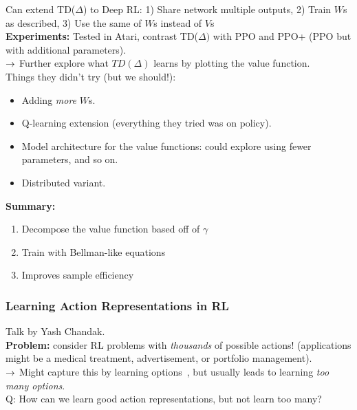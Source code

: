 Can extend TD($\Delta$) to Deep RL: 1) Share network multiple outputs, 2) Train $W$s as described, 3) Use the same of $W$s instead of $V$s \\

{\bf Experiments:} Tested in Atari, contrast TD($\Delta)$ with PPO and PPO+ (PPO but with additional parameters). \\

$\rightarrow$ Further explore what $TD(\Delta)$ learns by plotting the value function. \\

Things they didn't try (but we should!):
\begin{itemize}
    \item Adding {\it more} $W$s.
    \item Q-learning extension (everything they tried was on policy).
    \item Model architecture for the value functions: could explore using fewer parameters, and so on.
    \item Distributed variant.
\end{itemize}

{\bf Summary:}
\begin{enumerate}
    \item Decompose the value function based off of $\gamma$
    \item Train with Bellman-like equations
    \item Improves sample efficiency
\end{enumerate}

\spacerule
\subsubsection{Learning Action Representations in RL~\cite{chandak2019learning}}

Talk by Yash Chandak. \\

{\bf Problem:} consider RL problems with {\it thousands} of possible actions! (applications might be a medical treatment, advertisement, or portfolio management). \\

$\rightarrow$ Might capture this by learning options~\cite{sutton1999between}, but usually leads to learning {\it too many options}. \\

Q: How can we learn good action representations, but not learn too many? \\

